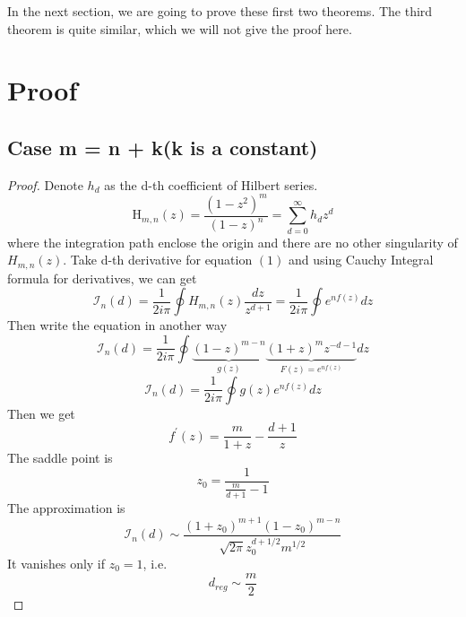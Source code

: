 \documentclass[a4paper]{article}
\theoremstyle{definition}
\theoremstyle{remark}
\begin{document}
In the next section, we are going to prove these first two theorems. The third theorem is quite similar, which we will not give the proof here.
\section{Proof}
\subsection{Case m = n + k(k is a constant)}
\begin{proof}
Denote $h_{d}$ as the d-th coefficient of Hilbert series.\\
\begin{equation}  \mathrm {H}_{m,n} ( z ) = \frac { \left( 1 - z ^ { 2 } \right) ^ { m } } { ( 1 - z ) ^ { n } } = \sum _ { d = 0 } ^ { \infty } h _ { d } z ^ { d } \end{equation}
where the integration path enclose the origin and there are no other singularity of $H_{m,n}(z)$.
Take d-th derivative for equation $(1)$ and using Cauchy Integral formula for derivatives, we can get
\begin{equation} \mathcal { I } _ { n } ( d )  = \frac { 1 } { 2i \pi } \oint H _ { m , n } ( z ) \frac { d z } { z ^ { d + 1 } } = \frac { 1 } { 2i \pi } \oint e ^ { n f ( z ) } d z \end{equation}
Then write the equation in another way
\begin{equation} 
\mathcal { I } _ { n } ( d ) = \frac { 1 } { 2i \pi } \oint \underbrace { ( 1 - z ) ^ { m - n } } _ { g ( z ) } \underbrace { ( 1 + z ) ^ { m } z ^ { - d - 1 } } _ { F ( z ) = e ^ { n f ( z ) } } d z
\end{equation}
\begin{equation} 
\mathcal { I } _ { n } ( d ) =\frac { 1 } { 2i \pi }\oint g (z) e ^ { n f ( z ) } dz
\end{equation}
Then we get
\begin{equation} 
f ^ { \prime } ( z ) = \frac { m } { 1 + z } - \frac { d + 1 } { z }
\end{equation}
The saddle point is
\begin{equation} z _ { 0 } = \frac { 1 } { \frac { m } { d + 1 } - 1 } \end{equation}
The approximation is
\begin{equation}
\mathcal { I } _ { n } ( d ) \sim \frac { \left( 1 + z _ { 0 } \right) ^ { m + 1 } \left( 1 - z _ { 0 } \right) ^ { m - n } } { \sqrt { 2 \pi } z _ { 0 } ^ { d + 1 / 2 } m ^ { 1 / 2 } }
\end{equation}
It vanishes only if $z_{0}=1$, i.e.
\begin{equation}
d _ { r e g } \sim \frac { m } { 2 }
\end{equation}
\end{proof}
\end{document}
